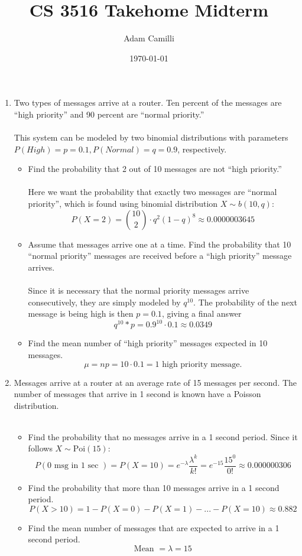\documentclass[12pt]{article}
\title{CS 3516 Takehome Midterm}
\author{Adam Camilli}
\date{\today}
\begin{document}
\maketitle

\begin{enumerate}
\item Two types of messages arrive at a router. Ten percent of the messages are “high priority” and 90 percent are “normal priority.” \\ \\
  This system can be modeled by two binomial distributions with parameters $P(High) = p = 0.1, P(Normal) = q = 0.9$, respectively.
  \begin{itemize}
  \item Find the probability that 2 out of 10 messages are not “high priority.” \\ \\
    Here we want the probability that exactly two messages are ``normal priority'', which is found using binomial distribution $X \sim b(10,q)$:
    \[ P(X=2) = \binom{10}{2} \cdot q^2 (1-q)^8 \approx 0.0000003645 \]
  \item Assume that messages arrive one at a time. Find the probability that 10 “normal priority” messages are received before a “high priority” message arrives. \\ \\
    Since it is necessary that the normal priority messages arrive consecutively, they are simply modeled by $q^{10}$. The probability of the next message is being high is then $p=0.1$, giving a final answer
    \[ q^{10} * p = 0.9^{10} \cdot 0.1 \approx 0.0349 \]
  \item Find the mean number of “high priority” messages expected in 10 messages.
    \[ \mu = np = 10\cdot 0.1 = 1 \textrm{ high priority message.}\]
  \end{itemize}

\newpage

\item Messages arrive at a router at an average rate of 15 messages per second. The number of messages that arrive in 1 second is known have a Poisson distribution. \\ \\
  \begin{itemize}
  \item Find the probability that no messages arrive in a 1 second period. 
   Since it follows $X \sim \textrm{Poi}(15)$:
   \[ P(0 \textrm{ msg in 1 sec }) = P(X=10) = e^{-\lambda}\frac{{\lambda}^k}{k!} = e^{-15}\frac{15^0}{0!} \approx 0.000000306 \]
  \item Find the probability that more than 10 messages arrive in a 1 second period. 
    \[ P(X > 10) = 1 - P(X=0) - P(X=1) - ... - P(X = 10) \approx 0.882 \] 
  \item Find the mean number of messages that are expected to arrive in a 1 second period. 
    \[ \textrm{Mean } = \lambda = 15\]
  \end{itemize}


\end{enumerate}
\end{document}
